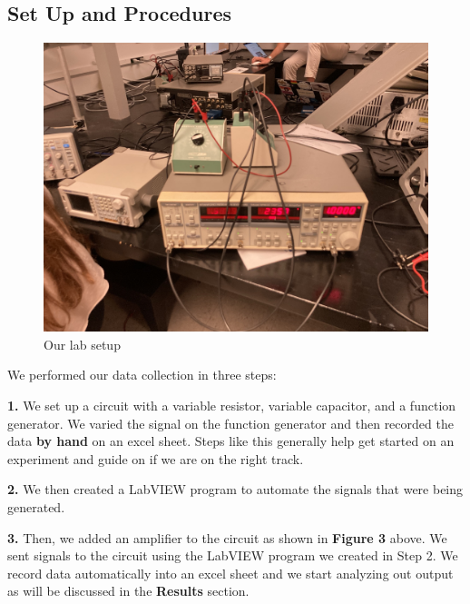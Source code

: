 \documentclass[twocolumn]{article}\usepackage[english]{babel}
\begin{document}
\subsection{Set Up and Procedures}
\begin{figure}
  \includegraphics[width=\linewidth]{images/lab/setup.JPEG}
  \caption{Our lab setup}
  \label{fig:LAB_SETUP}
\end{figure}

We performed our data collection in three steps:
\begin{Steps}
 \item{\textbf{1.} We set up a circuit with a variable resistor, variable capacitor, and  a function generator. We varied the signal on the function generator and then recorded the data \textbf{by hand} on an excel sheet. Steps like this generally help get started on an experiment and guide on if we are on the right track.} 
 \item{\textbf{2.} We then created a LabVIEW program to automate the signals that were being generated. } 
 \item{\textbf{3.} Then, we added an amplifier to the circuit as shown in \textbf{Figure 3} above. We sent signals to the circuit using the LabVIEW program we created in Step 2. We record data automatically into an excel sheet and we start analyzing out output as will be discussed in the \textbf{Results} section.}
\end{Steps} \newline
\end{document}

